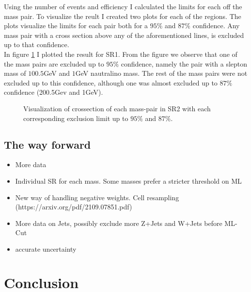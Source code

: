 \documentclass{article}
\begin{document}
\egroup
Using the number of events and efficiency I calculated the limits for each off the mass pair. To visualize the reult I created two plots for each of the regions. The plots visualize the limits for each pair both for a $95\%$ and $87\%$ confidence. Any mass pair with a cross section above any of the aforementioned lines, is excluded up to that confidence. 
\\
In figure \ref{fig:ExlusionSR1} I plotted the result for SR1. From the figure we observe that one of the mass pairs are excluded up to $95\%$ confidence, namely the pair with a slepton mass of $100.5$GeV and $1$GeV nautralino mass. The rest of the mass pairs were not excluded up to this confidence, although one was almost excluded up to $87\%$ confidence (200.5Gev and 1GeV).
\begin{figure}
     \caption{Visualization of crossection of each mass-pair in SR2 with each corresponding exclusion limit up to $95\%$ and $87\%$.}
     \label{fig:ExlusionSR1}
\end{figure}
\begin{figure}
\end{figure}


\subsection{The way forward}
\begin{itemize}
    \item More data
    \item Individual SR for each mass. Some masses prefer a stricter threshold on ML
    \item New way of handling negative weights. Cell resampling (https://arxiv.org/pdf/2109.07851.pdf)
    \item More data on Jets, possibly exclude more Z+Jets and W+Jets before ML-Cut
    \item accurate uncertainty 
\end{itemize}

\section{Conclusion}
\newpage
\printbibliography
\end{document}
